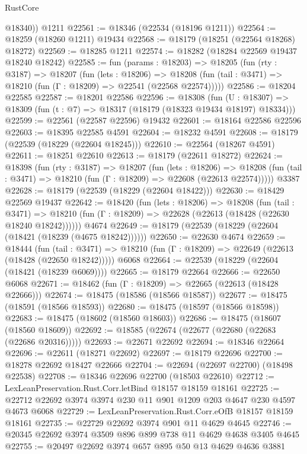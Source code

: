 \begin{lexlean}{RustCore}
\begin{coremodule}
        @18340))
    @1211
@22561 := @18346 (@22534 (@18196 @1211))
@22564 := @18259 (@18260 @1211) @19434
@22568 := @18179 (@18251 (@22564 @18268) @18272)
@22569 := @18285 @1211
@22574 := @18282 (@18284 @22569 @19437 @18240 @18242)
@22585 := fun (params : @18203) =>
  @18205
    (fun (rty : @3187) =>
    @18207
      (fun (lets : @18206) =>
      @18208 (fun (tail : @3471) => @18210 (fun (Γ : @18209) => @22541 (@22568 @22574)))))
@22586 := @18204 @22585
@22587 := @18201 @22586
@22596 := @18308
    (fun (U : @18307) => @18309 (fun (t : @7) => @18317 (@18179 (@18323 @19434 @18197) @18334)))
@22599 := @22561 (@22587 @22596) @19432
@22601 := @18164 @22586 @22596
@22603 := @18395 @22585 @4591
@22604 := @18232 @4591
@22608 := @18179 (@22539 (@18229 (@22604 @18245)))
@22610 := @22564 (@18267 @4591)
@22611 := @18251 @22610
@22613 := @18179 (@22611 @18272)
@22624 := @18398
    (fun (rty : @3187) =>
    @18207
      (fun (lets : @18206) =>
      @18208 (fun (tail : @3471) => @18210 (fun (Γ : @18209) => @22608 (@22613 @22574)))))
    @3387
@22628 := @18179 (@22539 (@18229 (@22604 @18422)))
@22630 := @18429 @22569 @19437
@22642 := @18420
    (fun (lets : @18206) =>
    @18208
      (fun (tail : @3471) =>
      @18210 (fun (Γ : @18209) => @22628 (@22613 (@18428 (@22630 @18240 @18242))))))
    @4674
@22649 := @18179 (@22539 (@18229 (@22604 (@18421 (@18239 (@4675 @18242))))))
@22650 := @22630 @4674
@22659 := @18444
    (fun (tail : @3471) => @18210 (fun (Γ : @18209) => @22649 (@22613 (@18428 (@22650 @18242)))))
    @6068
@22664 := @22539 (@18229 (@22604 (@18421 (@18239 @6069))))
@22665 := @18179 @22664
@22666 := @22650 @6068
@22671 := @18462 (fun (Γ : @18209) => @22665 (@22613 (@18428 @22666)))
@22674 := @18475 (@18586 (@18566 @18587))
@22677 := @18475 (@18591 (@18566 @18593))
@22680 := @18475 (@18597 (@18566 @18598))
@22683 := @18475 (@18602 (@18560 @18603))
@22686 := @18475 (@18607 (@18560 @18609))
@22692 := @18585 (@22674 (@22677 (@22680 (@22683 (@22686 @20316)))))
@22693 := @22671 @22692
@22694 := @18346 @22664
@22696 := @22611 (@18271 @22692)
@22697 := @18179 @22696
@22700 := @18278 @22692 @18427 @22666
@22704 := @22694 (@22697 @22700) (@18498 @22538)
@22708 := @18346 @22696 @22700 (@18503 @22610)
@22712 := LexLeanPreservation.Rust.Corr.letBind @18157 @18159 @18161
@22725 := @22712 @22692 @3974 @3974 @230 @11 @901 @1209 @203 @4647 @230 @4597 @4673 @6068
@22729 := LexLeanPreservation.Rust.Corr.eOfB @18157 @18159 @18161
@22735 := @22729 @22692 @3974 @901 @11 @4629 @4645
@22746 := @20345 @22692 @3974 @3509 @896 @899 @738 @11 @4629 @4638 @3405 @4645
@22755 := @20497 @22692 @3974 @657 @895 @50 @13 @4629 @4636 @3881

\end{coremodule}
\end{lexlean}
